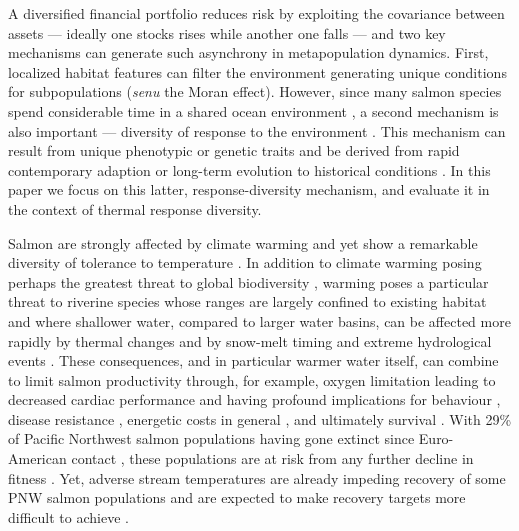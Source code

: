 A diversified financial portfolio reduces risk by exploiting the covariance between assets --- ideally one stocks rises while another one falls --- and two key mechanisms can generate such asynchrony in metapopulation dynamics. First, localized habitat features can filter the environment generating unique conditions for subpopulations \citep{schindler2008, rogers2008} (\emph{senu} the Moran effect). However, since many salmon species spend considerable time in a shared ocean environment \citep{quinn2005}, a second mechanism is also important --- diversity of response to the environment \citetext{\citealp[i.e.~response diversity,][]{elmqvist2003}; \citealp[and biocomplexity][]{colwell1998}; \citealp{hilborn2003}}. This mechanism can result from unique phenotypic or genetic traits \citep{crozier2008, kovach2012} and be derived from rapid contemporary adaption \citep{stockwell2003, fraser2011} or long-term evolution to historical conditions \citep{eliason2011}. In this paper we focus on this latter, response-diversity mechanism, and evaluate it in the context of thermal response diversity.

Salmon are strongly affected by climate warming and yet show a remarkable diversity of tolerance to temperature \citep{beacham1989, crozier2006, crozier2008}. In addition to climate warming posing perhaps the greatest threat to global biodiversity \citep{thomas2004}, warming poses a particular threat to riverine species whose ranges are largely confined to existing habitat \citep{thomas2010} and where shallower water, compared to larger water basins, can be affected more rapidly by thermal changes \citep{isaak2010} and by snow-melt timing and extreme hydrological events \citep{crozier2008}. These consequences, and in particular warmer water itself, can combine to limit salmon productivity through, for example, oxygen limitation \citep{portner2007} leading to decreased cardiac performance \citep{eliason2011} and having profound implications for behaviour \citep{goniea2006}, disease resistance \citep{crozier2008}, energetic costs in general \citep{rand1998}, and ultimately survival \citep{peterman1998, eliason2011}. With 29\% of Pacific Northwest salmon populations having gone extinct since Euro-American contact \citep{gustafson2007}, these populations are at risk from any further decline in fitness \citep{mcclure2003}. Yet, adverse stream temperatures are already impeding recovery of some PNW salmon populations \citep{mccullough1999} and are expected to make recovery targets more difficult to achieve \citep{battin2007}.


